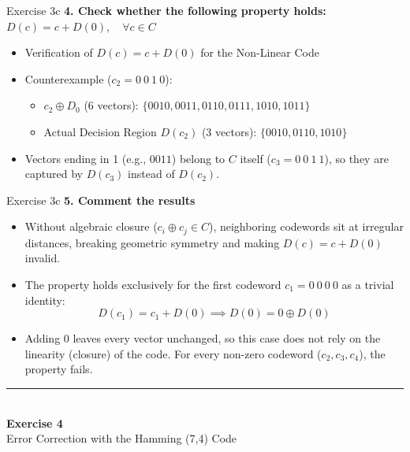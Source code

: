 \documentclass[10pt, aspectratio=169]{beamer}
\newcommand{\question}[1]{{\color{QuestionRed}\textbf{#1}}}
\begin{document}
\begin{frame}{Exercise 3c}
  \question{4. Check whether the following property holds: $D(c) = c + D(0), \quad \forall c \in C$}

  \vspace{0.25cm}
  \begin{itemize}
    \item Verification of $D(c) = c + D(0)$ for the Non-Linear Code
    \item Counterexample ($c_2 = 0\ 0\ 1\ 0$):
    \begin{itemize}
      \item $c_2 \oplus D_0$ (6 vectors): $\{0010, 0011, 0110, 0111, 1010, 1011\}$
      \item Actual Decision Region $D(c_2)$ (3 vectors): $\{0010, 0110, 1010\}$
    \end{itemize}
    \item Vectors ending in 1 (e.g., $0011$) belong to $C$ itself ($c_3 = 0\ 0\ 1\ 1$), so they are captured by $D(c_3)$ instead of $D(c_2)$.
  \end{itemize}
\end{frame}

\begin{frame}{Exercise 3c}
  \question{5. Comment the results}

  \vspace{0.25cm}
  \begin{itemize}
    \item Without algebraic closure ($c_i \oplus c_j \in C$), neighboring codewords sit at irregular distances, breaking geometric symmetry and making $D(c) = c + D(0)$ invalid.
    \item The property holds exclusively for the first codeword $c_1 = 0\ 0\ 0\ 0$ as a trivial identity:
    \[
      D(c_1) = c_1 + D(0) \implies D(0) = 0 \oplus D(0)
    \]
    \item Adding $0$ leaves every vector unchanged, so this case does not rely on the linearity (closure) of the code. For every non-zero codeword ($c_2, c_3, c_4$), the property fails.
  \end{itemize}
\end{frame}

\begin{frame}[plain]
  \vfill
  \centering
  {\color{TealAccent}\rule{2cm}{2pt}}\\[0.4cm]
  {\LARGE\bfseries\color{NavyPrimary} Exercise 4}\\[0.2cm]
  {\large\color{SlateNeutral} Error Correction with the Hamming (7,4) Code}
  \vfill
\end{frame}
\end{document}
